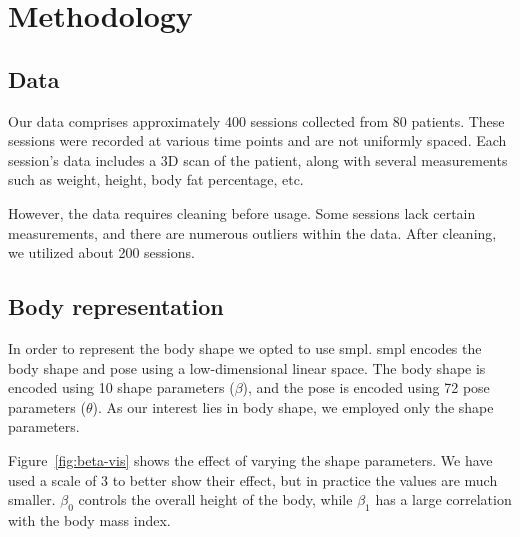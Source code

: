 
\chapter{Methodology}\label{methodology}

\section{Data}

Our data comprises approximately 400 sessions collected from 80 patients. These
sessions were recorded at various time points and are not uniformly spaced.
Each session's data includes a 3D scan of the patient, along with several
measurements such as weight, height, body fat percentage, etc.



However, the data requires cleaning before usage. Some sessions lack certain
measurements, and there are numerous outliers within the data. After cleaning,
we utilized about 200 sessions.


\section{Body representation}

In order to represent the body shape we opted to use \gls{smpl}. \gls{smpl}
encodes the body shape and pose using a low-dimensional linear space. The body
shape is encoded using 10 shape parameters ($\beta$), and the pose is encoded
using 72 pose parameters ($\theta$). As our interest lies in body shape, we
employed only the shape parameters.



Figure~\ref{fig:beta-vis} shows the effect of varying the shape parameters. We
have used a scale of 3 to better show their effect, but in practice the values
are much smaller. $\beta_0$ controls the overall height of the body, while
$\beta_1$ has a large correlation with the body mass index.


